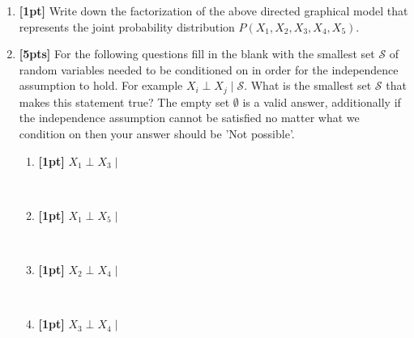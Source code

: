 \documentclass[11pt,addpoints,answers]{exam}
\begin{document}
\begin{enumerate}
\item \textbf{[1pt]} Write down the factorization of the above directed graphical model that represents the joint probability distribution $P(X_1,X_2,X_3,X_4,X_5)$.

\begin{tcolorbox}[fit,height=1cm, width=15cm, blank, borderline={1pt}{-2pt},nobeforeafter]
\end{tcolorbox}


\item \textbf{[5pts]} For the following questions fill in the blank with the smallest set $\mathcal{S}$ of random variables needed to be conditioned on in order for the independence assumption to hold. For example $X_i \perp X_j \mid \mathcal{S}$. What is the smallest set $\mathcal{S}$ that makes this statement true? The empty set $\emptyset$ is a valid answer, additionally if the independence assumption cannot be satisfied no matter what we condition on then your answer should be 'Not possible'.
\begin{enumerate}

\item \textbf{[1pt]} $X_1 \perp X_3 \mid $ \begin{tcolorbox}[fit,height=1cm, width=2cm, blank, borderline={1pt}{-2pt},nobeforeafter]
\end{tcolorbox}  \\

\item \textbf{[1pt]} $X_1 \perp X_5 \mid$ \begin{tcolorbox}[fit,height=1cm, width=2cm, blank, borderline={1pt}{-2pt},nobeforeafter]
\end{tcolorbox}   \\

\item \textbf{[1pt]} $X_2 \perp X_4 \mid $ \begin{tcolorbox}[fit,height=1cm, width=2cm, blank, borderline={1pt}{-2pt},nobeforeafter]
\end{tcolorbox}  \\

\item \textbf{[1pt]} $X_3 \perp X_4 \mid $ \begin{tcolorbox}[fit,height=1cm, width=2cm, blank, borderline={1pt}{-2pt},nobeforeafter]
\end{tcolorbox}  \\


\end{enumerate}
\end{enumerate}
\end{document}
